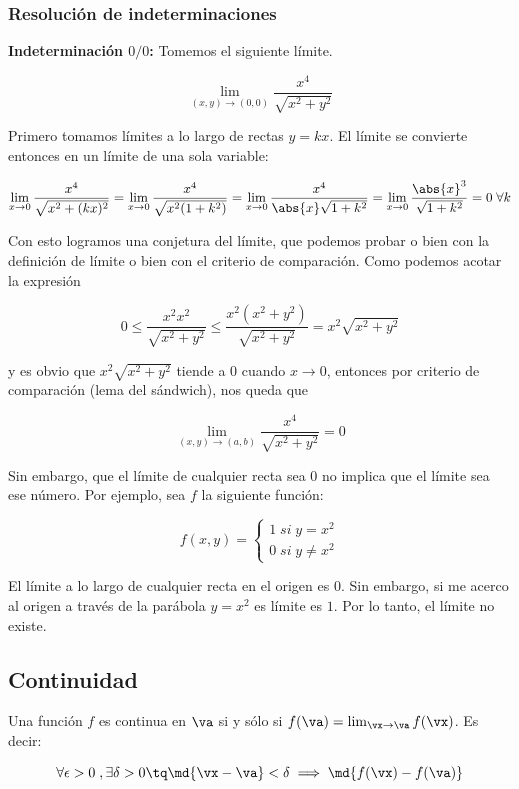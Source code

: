 \documentclass[nochap]{apuntes}
\begin{document}
\subsubsection{Resolución de indeterminaciones}

\textbf{Indeterminación $0/0$:} Tomemos el siguiente límite.

\[ \lim_{(x,y)\to(0,0)} \frac{x^4}{\sqrt{x^2+y^2}} \]

Primero tomamos límites a lo largo de rectas $y=kx$. El límite se convierte entonces en un límite de una sola variable:

\[\lim_{x\to 0} \frac{x^4}{\sqrt{x^2+(kx)^2}} = \lim_{x\to 0} \frac{x^4}{\sqrt{x^2(1+k^2)}} = \lim_{x\to 0} \frac{x^4}{\abs{x}\sqrt{1+k^2}} = \lim_{x\to 0} \frac{\abs{x}^3}{\sqrt{1+k^2}} = 0\; \forall k\]

Con esto logramos una conjetura del límite, que podemos probar o bien con la definición de límite o bien con el criterio de comparación. Como podemos acotar la expresión

\[ 0 \leq \frac{x^2x^2}{\sqrt{x^2+y^2}} \leq \frac{x^2(x^2+y^2)}{\sqrt{x^2+y^2}} = x^2\sqrt{x^2+y^2} \]

y es obvio que $x^2\sqrt{x^2+y^2}$ tiende a $0$ cuando $x\to 0$, entonces por criterio de comparación (lema del sándwich), nos queda que

\[\lim_{(x,y)\to(a,b)}\frac{x^4}{\sqrt{x^2+y^2}} = 0 \]

Sin embargo, que el límite de cualquier recta sea 0 no implica que el límite sea ese número. Por ejemplo, sea $f$ la siguiente función:

\[ f (x,y) = \left\lbrace \begin{matrix} 1\; si\; y=x^2 \\ 0 \; si \; y\neq x^2  \end{matrix}\right. \]

El límite a lo largo de cualquier recta en el origen es $0$. Sin embargo, si me acerco al origen a través de la parábola $y=x^2$ es límite es $1$. Por lo tanto, el límite no existe.

\subsection{Continuidad}

\begin{defn} Una función $f$ es continua en $\va$ si y sólo si $f(\va) = \lim_{\vx\to\va} f(\vx)$. Es decir:

\[ \forall \epsilon > 0\; , \exists \delta > 0 \tq \md{\vx-\va} < \delta \implies \md{f(\vx)-f(\va)} \]
\end{defn}
\end{document}
